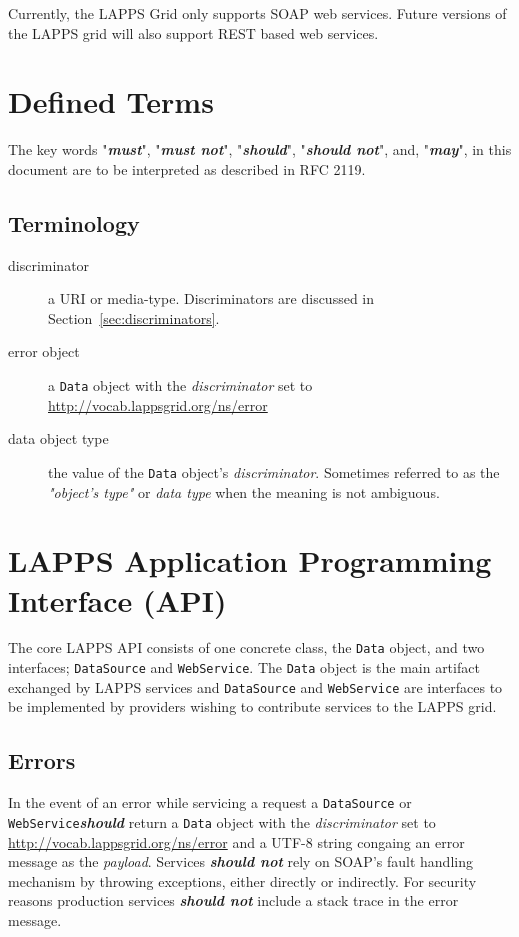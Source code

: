 \documentclass{article}
\newcommand{\lapps}{LAPPS\xspace}
\newcommand{\data}{\texttt{Data}\xspace}
\newcommand{\source}{\texttt{DataSource}\xspace}
\newcommand{\service}{\texttt{WebService}\xspace}
\newcommand{\discriminator}{\textit{discriminator}\xspace}
\newcommand{\payload}{\textit{payload}\xspace}
\newcommand{\ns}[1]{\url{http://vocab.lappsgrid.org/ns/#1}}
\newcommand{\definedterm}[1]{\textbf{\textit{#1}}\xspace}
\newcommand{\must}{\definedterm{must}}
\newcommand{\mustnot}{\definedterm{must not}}
\newcommand{\should}{\definedterm{should}}
\newcommand{\shouldnot}{\definedterm{should not}}
\newcommand{\may}{\definedterm{may}}
\begin{document}
Currently, the \lapps Grid only supports SOAP\cite{soap} web services. Future versions of the \lapps grid will also support REST based web services.



\section{Defined Terms}
The key words "\must", "\mustnot", "\should", "\shouldnot", and,  "\may", in this document are to be interpreted as described in
      RFC 2119\cite{rfc2119}.

\subsection{Terminology}
\begin{description}
\item[discriminator] a URI or media-type. Discriminators are discussed in Section~\ref{sec:discriminators}.
\item[error object] a \data object with the \discriminator set to \ns{error}
\item[data object type] the value of the \data object's \discriminator. Sometimes referred to as the \emph{"object's type"} or \emph{data type} when the meaning is not ambiguous.
\end{description}



\section{LAPPS Application Programming Interface (API)}

The core  \lapps  API consists of one concrete class, the \data  object, and two interfaces; \source and \service.  The \data object is the main artifact exchanged by \lapps services and \source and \service are interfaces to be implemented by providers wishing to contribute services to the \lapps grid.  


\subsection{Errors}

In the event of an error while servicing a request a \source or \service \should return a \data object with the \discriminator set to \ns{error} and a UTF-8 string congaing an error message as the \payload. Services \shouldnot rely on SOAP's fault handling mechanism by throwing exceptions, either directly or indirectly. For security reasons production services \shouldnot include a stack trace in the error message.
\end{document}

